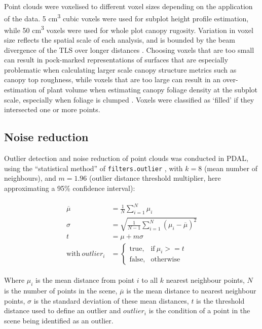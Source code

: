\begin{refsection}
Point clouds were voxelised to different voxel sizes depending on the application of the data. 5 cm\textsuperscript{3} cubic voxels were used for subplot height profile estimation, while 50 cm\textsuperscript{3} voxels were used for whole plot canopy rugosity. Variation in voxel size reflects the spatial scale of each analysis, and is bounded by the beam divergence of the TLS over longer distances \citep{Grau2017}. Choosing voxels that are too small can result in pock-marked representations of surfaces that are especially problematic when calculating larger scale canopy structure metrics such as canopy top roughness, while voxels that are too large can result in an over-estimation of plant volume when estimating canopy foliage density at the subplot scale, especially when foliage is clumped \citep{Seidel2012, Cifuentes2014}. Voxels were classified as `filled' if they intersected one or more points. 

\subsection{Noise reduction}

Outlier detection and noise reduction of point clouds was conducted in PDAL, using the ``statistical method'' of \texttt{filters.outlier} \citep{Rusu2008}, with $k = 8$ (mean number of neighbours), and $m = 1.96$ (outlier distance threshold multiplier, here approximating a 95\% confidence interval):

\begin{align}
\begin{split}
	\overline{\mu} &= \frac{1}{N} \sum_{i=1}^{N} \mu_{i} \\
	\sigma &= \sqrt{\frac{1}{N-1} \sum_{i=1}^{N}(\mu_{i} - \overline{\mu{}})^2} \\
	t &= \mu + m \sigma \\
	\text{with}\ outlier_{i} &= 
		\begin{cases}
			\text{true},& \text{if}\ \mu_{i} >= t \\
			\text{false},& \text{otherwise}
		\end{cases}
\end{split}
\end{align}

Where $\mu_{i}$ is the mean distance from point $i$ to all $k$ nearest neighbour points, $N$ is the number of points in the scene, $\overline{\mu}$ is the mean distance to nearest neighbour points, $\sigma$ is the standard deviation of these mean distances, $t$ is the threshold distance used to define an outlier and $outlier_{i}$ is the condition of a point in the scene being identified as an outlier.


\end{refsection}
